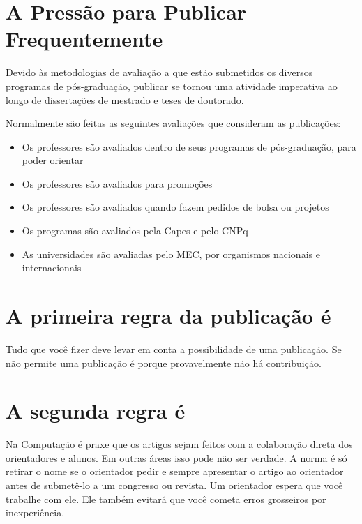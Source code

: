 \section{A Pressão para Publicar Frequentemente}

Devido às metodologias de avaliação a que estão submetidos os diversos programas de pós-graduação, publicar se tornou uma atividade imperativa ao longo de dissertações de mestrado e teses de doutorado.

Normalmente são feitas as seguintes avaliações que consideram as publicações:

\begin{itemize}
  \item Os professores são avaliados dentro de seus programas de pós-graduação, para poder orientar
  \item Os professores são avaliados para promoções
  \item Os professores são avaliados quando fazem pedidos de bolsa ou projetos
  \item Os programas são avaliados pela Capes e pelo CNPq
  \item As universidades são avaliadas pelo MEC, por organismos nacionais e internacionais 
\end{itemize}

\section{A primeira regra da publicação é}


Tudo que você fizer deve levar em conta a possibilidade de uma publicação. Se não permite uma publicação é porque provavelmente não há contribuição.

\section{A segunda regra é}


Na Computação é praxe que os artigos sejam feitos com a colaboração direta dos orientadores e alunos. Em outras áreas isso pode não ser verdade. A norma é só retirar o nome se o orientador pedir e sempre apresentar o artigo ao orientador antes de submetê-lo a um congresso ou revista. Um orientador espera que você trabalhe com ele. Ele também evitará que você cometa erros grosseiros por inexperiência. 

